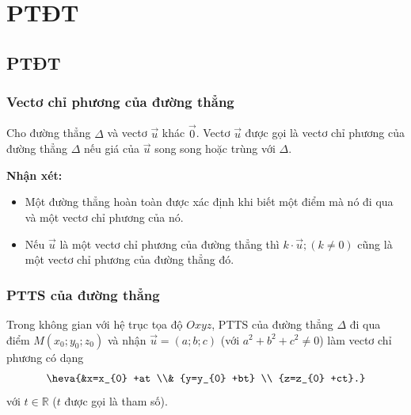 \section{PTĐT}

\subsection{PTĐT}

\subsubsection{Vectơ chỉ phương của đường thẳng}
 Cho đường thẳng $\Delta $ và vectơ $\overrightarrow{u}$ khác $\overrightarrow{0}$. Vectơ $\overrightarrow{u}$ được gọi là vectơ chỉ phương của đường thẳng $\Delta $ nếu giá của $\overrightarrow{u}$ song song hoặc trùng với $\Delta $.
 \begin{center}
\end{center}
 \textbf{Nhận xét:}
\begin{itemize}
	\item  Một đường thẳng hoàn toàn được xác định khi biết một điểm mà nó đi qua và một vectơ chỉ phương của nó.
	\item  Nếu $\overrightarrow{u}$ là một vectơ chỉ phương của đường thẳng thì $k\cdot\overrightarrow{u}; (k\ne 0)$ cũng là một vectơ chỉ phương của đường thẳng đó.
\end{itemize}

\subsubsection{PTTS của đường thẳng}

 Trong không gian với hệ trục tọa độ $Oxyz$, PTTS của đường thẳng $\Delta $ đi qua điểm $M(x_{0} ;y_{0} ;z_{0} )$ và nhận $\overrightarrow{u}=(a;b;c)$ (với $a^{2} +b^{2} +c^{2} \ne 0$) làm vectơ chỉ phương có dạng
 $$\heva{&x=x_{0} +at \\& {y=y_{0} +bt} \\ {z=z_{0} +ct}.} $$   với $t\in  \mathbb{R}$ ($t$ được gọi là tham số).
\begin{center}
\end{center}

